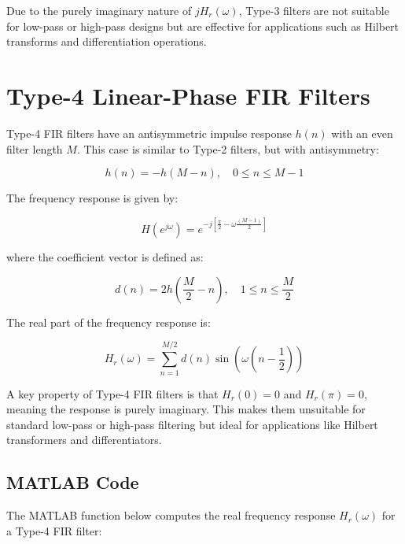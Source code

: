 \documentclass[a4paper,12pt]{article}
\begin{document}
Due to the purely imaginary nature of \( jH_r(\omega) \), Type-3 filters are not suitable for low-pass or high-pass designs but are effective for applications such as Hilbert transforms and differentiation operations.
\section{Type-4 Linear-Phase FIR Filters}

Type-4 FIR filters have an antisymmetric impulse response \( h(n) \) with an even filter length \( M \). This case is similar to Type-2 filters, but with antisymmetry:

\[
h(n) = -h(M-n), \quad 0 \leq n \leq M-1
\]

The frequency response is given by:

\[
H(e^{j\omega}) = e^{-j\left[\frac{\pi}{2} - \omega \frac{(M-1)}{2} \right]}
\]

where the coefficient vector is defined as:

\[
d(n) = 2h\left(\frac{M}{2} - n\right), \quad 1 \leq n \leq \frac{M}{2}
\]

The real part of the frequency response is:

\[
H_r(\omega) = \sum_{n=1}^{M/2} d(n) \sin\left(\omega (n - \frac{1}{2})\right)
\]

A key property of Type-4 FIR filters is that \( H_r(0) = 0 \) and \( H_r(\pi) = 0 \), meaning the response is purely imaginary. This makes them unsuitable for standard low-pass or high-pass filtering but ideal for applications like Hilbert transformers and differentiators.

\subsection{MATLAB Code}

The MATLAB function below computes the real frequency response \( H_r(\omega) \) for a Type-4 FIR filter:
\end{document}
